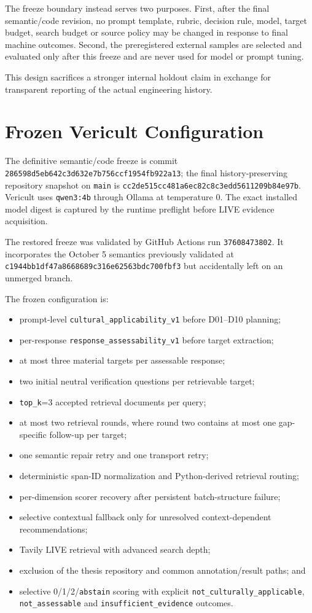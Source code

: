 The freeze boundary instead serves two purposes. First, after the final semantic/code revision, no prompt template, rubric, decision rule, model, target budget, search budget or source policy may be changed in response to final machine outcomes. Second, the preregistered external samples are selected and evaluated only after this freeze and are never used for model or prompt tuning.

This design sacrifices a stronger internal holdout claim in exchange for transparent reporting of the actual engineering history.

\section{Frozen Vericult Configuration}

The definitive semantic/code freeze is commit
\texttt{286598d5eb642c3d632e7b756ccf1954fb922a13}; the final history-preserving repository snapshot on \texttt{main} is
\texttt{cc2de515cc481a6ec82c8c3edd5611209b84e97b}. Vericult uses \texttt{qwen3:4b} through Ollama at temperature 0. The exact installed model digest is captured by the runtime preflight before LIVE evidence acquisition.

The restored freeze was validated by GitHub Actions run \texttt{37608473802}. It incorporates the October 5 semantics previously validated at \texttt{c1944bb1df47a8668689c316e62563bdc700fbf3} but accidentally left on an unmerged branch.

The frozen configuration is:
\begin{itemize}
    \item prompt-level \texttt{cultural\_applicability\_v1} before D01--D10 planning;
    \item per-response \texttt{response\_assessability\_v1} before target extraction;
    \item at most three material targets per assessable response;
    \item two initial neutral verification questions per retrievable target;
    \item \texttt{top\_k}=3 accepted retrieval documents per query;
    \item at most two retrieval rounds, where round two contains at most one gap-specific follow-up per target;
    \item one semantic repair retry and one transport retry;
    \item deterministic span-ID normalization and Python-derived retrieval routing;
    \item per-dimension scorer recovery after persistent batch-structure failure;
    \item selective contextual fallback only for unresolved context-dependent recommendations;
    \item Tavily LIVE retrieval with advanced search depth;
    \item exclusion of the thesis repository and common annotation/result paths; and
    \item selective 0/1/2/\texttt{abstain} scoring with explicit \texttt{not\_culturally\_applicable}, \texttt{not\_assessable} and \texttt{insufficient\_evidence} outcomes.
\end{itemize}

